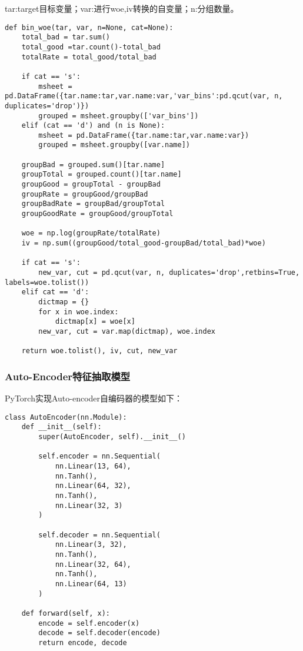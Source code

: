 tar:target目标变量；var:进行woe,iv转换的自变量；n:分组数量。
\begin{lstlisting}[frame=shadowbox]
    def bin_woe(tar, var, n=None, cat=None):
    total_bad = tar.sum()
    total_good =tar.count()-total_bad
    totalRate = total_good/total_bad
    
    if cat == 's':
        msheet = pd.DataFrame({tar.name:tar,var.name:var,'var_bins':pd.qcut(var, n, duplicates='drop')})
        grouped = msheet.groupby(['var_bins'])
    elif (cat == 'd') and (n is None):
        msheet = pd.DataFrame({tar.name:tar,var.name:var})
        grouped = msheet.groupby([var.name])
        
    groupBad = grouped.sum()[tar.name]
    groupTotal = grouped.count()[tar.name]
    groupGood = groupTotal - groupBad
    groupRate = groupGood/groupBad
    groupBadRate = groupBad/groupTotal
    groupGoodRate = groupGood/groupTotal

    woe = np.log(groupRate/totalRate)
    iv = np.sum((groupGood/total_good-groupBad/total_bad)*woe)
    
    if cat == 's':
        new_var, cut = pd.qcut(var, n, duplicates='drop',retbins=True, labels=woe.tolist())
    elif cat == 'd':
        dictmap = {}
        for x in woe.index:
            dictmap[x] = woe[x]
        new_var, cut = var.map(dictmap), woe.index

    return woe.tolist(), iv, cut, new_var
\end{lstlisting}

\subsubsection{Auto-Encoder特征抽取模型}
PyTorch实现Auto-encoder自编码器的模型如下：
\begin{lstlisting}[frame=shadowbox]
    class AutoEncoder(nn.Module):
    def __init__(self):
        super(AutoEncoder, self).__init__()
        
        self.encoder = nn.Sequential(
            nn.Linear(13, 64),
            nn.Tanh(),
            nn.Linear(64, 32),
            nn.Tanh(),
            nn.Linear(32, 3)
        )
        
        self.decoder = nn.Sequential(
            nn.Linear(3, 32),
            nn.Tanh(),
            nn.Linear(32, 64),
            nn.Tanh(),
            nn.Linear(64, 13)
        )
        
    def forward(self, x):
        encode = self.encoder(x)
        decode = self.decoder(encode)
        return encode, decode
\end{lstlisting}

